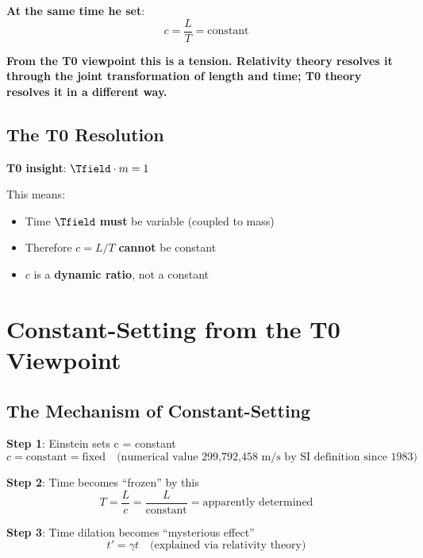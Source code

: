 	\textbf{At the same time he set}: 
	\begin{equation}
		c = \frac{L}{T} = \text{constant}
	\end{equation}
	
	\textbf{From the T0 viewpoint this is a tension. Relativity theory resolves it through the joint transformation of length and time; T0 theory resolves it in a different way.}
	
	\subsection{The T0 Resolution}
	
	\textbf{T0 insight}: $\Tfield \cdot m = 1$
	
	This means:
	\begin{itemize}
		\item Time $\Tfield$ \textbf{must} be variable (coupled to mass)
		\item Therefore $c = L/T$ \textbf{cannot} be constant
		\item $c$ is a \textbf{dynamic ratio}, not a constant
	\end{itemize}
	
	\section{Constant-Setting from the T0 Viewpoint}
	
	\subsection{The Mechanism of Constant-Setting}
	
	\textbf{Step 1}: Einstein sets c = constant
	\begin{equation}
		c = \text{constant} = \text{fixed} \quad \text{(numerical value 299,792,458 m/s by SI definition since 1983)}
	\end{equation}
	
	\textbf{Step 2}: Time becomes ``frozen'' by this
	\begin{equation}
		T = \frac{L}{c} = \frac{L}{\text{constant}} = \text{apparently determined}
	\end{equation}
	
	\textbf{Step 3}: Time dilation becomes ``mysterious effect''
	\begin{equation}
		t' = \gamma t \quad \text{(explained via relativity theory)}
	\end{equation}
	
